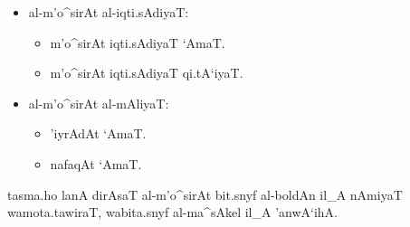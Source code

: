 \begin{itemize}
    \item al-m'o^sirAt al-iqti.sAdiyaT:
    \begin{itemize}
        \item m'o^sirAt iqti.sAdiyaT `AmaT.
        \item m'o^sirAt iqti.sAdiyaT qi.tA`iyaT.
    \end{itemize}
    
    \item al-m'o^sirAt al-mAliyaT:
    \begin{itemize}
        \item 'iyrAdAt `AmaT.
        \item nafaqAt `AmaT.
    \end{itemize}
\end{itemize}

tasma.ho lanA dirAsaT al-m'o^sirAt bit.snyf al-boldAn il_A nAmiyaT
wamota.tawiraT, wabita.snyf al-ma^sAkel il_A 'anwA`ihA.
